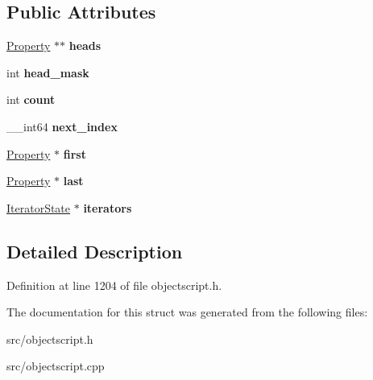 \subsection*{Public Attributes}
\begin{DoxyCompactItemize}
\item 
\hyperlink{struct_object_script_1_1_o_s_1_1_core_1_1_property}{Property} $\ast$$\ast$ {\bfseries heads}\hypertarget{struct_object_script_1_1_o_s_1_1_core_1_1_table_ad2f7ae180f408767d74b90b87a4e5062}{}\label{struct_object_script_1_1_o_s_1_1_core_1_1_table_ad2f7ae180f408767d74b90b87a4e5062}

\item 
int {\bfseries head\+\_\+mask}\hypertarget{struct_object_script_1_1_o_s_1_1_core_1_1_table_abe5f4996199e7a395196c2077b8195c8}{}\label{struct_object_script_1_1_o_s_1_1_core_1_1_table_abe5f4996199e7a395196c2077b8195c8}

\item 
int {\bfseries count}\hypertarget{struct_object_script_1_1_o_s_1_1_core_1_1_table_aa51943b4f5e8529cae6bf07bfc3c45ac}{}\label{struct_object_script_1_1_o_s_1_1_core_1_1_table_aa51943b4f5e8529cae6bf07bfc3c45ac}

\item 
\+\_\+\+\_\+int64 {\bfseries next\+\_\+index}\hypertarget{struct_object_script_1_1_o_s_1_1_core_1_1_table_a9fe27906157ff83c9e436e119b870ca9}{}\label{struct_object_script_1_1_o_s_1_1_core_1_1_table_a9fe27906157ff83c9e436e119b870ca9}

\item 
\hyperlink{struct_object_script_1_1_o_s_1_1_core_1_1_property}{Property} $\ast$ {\bfseries first}\hypertarget{struct_object_script_1_1_o_s_1_1_core_1_1_table_aac58a156b4b450efa1d9eebff7a22b54}{}\label{struct_object_script_1_1_o_s_1_1_core_1_1_table_aac58a156b4b450efa1d9eebff7a22b54}

\item 
\hyperlink{struct_object_script_1_1_o_s_1_1_core_1_1_property}{Property} $\ast$ {\bfseries last}\hypertarget{struct_object_script_1_1_o_s_1_1_core_1_1_table_ab21de60c49de77249327fa32c3fd30fd}{}\label{struct_object_script_1_1_o_s_1_1_core_1_1_table_ab21de60c49de77249327fa32c3fd30fd}

\item 
\hyperlink{struct_object_script_1_1_o_s_1_1_core_1_1_table_1_1_iterator_state}{Iterator\+State} $\ast$ {\bfseries iterators}\hypertarget{struct_object_script_1_1_o_s_1_1_core_1_1_table_a9af0e2fc3ee3a6cee385c396a82fd328}{}\label{struct_object_script_1_1_o_s_1_1_core_1_1_table_a9af0e2fc3ee3a6cee385c396a82fd328}

\end{DoxyCompactItemize}


\subsection{Detailed Description}


Definition at line 1204 of file objectscript.\+h.



The documentation for this struct was generated from the following files\+:\begin{DoxyCompactItemize}
\item 
src/objectscript.\+h\item 
src/objectscript.\+cpp\end{DoxyCompactItemize}

